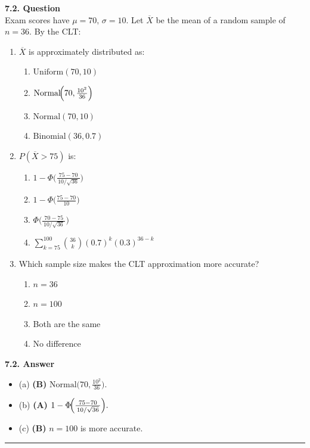 \documentclass[12pt]{article}
\begin{document}
\textbf{7.2. Question}\\
Exam scores have $\mu=70,\,\sigma=10.$ Let $\overline{X}$ be the mean of a random sample of $n=36.$ By the CLT:
\begin{enumerate}[label=(\alph*)]
\item $\overline{X}$ is approximately distributed as:
  \begin{enumerate}[label=\Alph*.]
  \item $\mathrm{Uniform}(70,10)$
  \item $\mathrm{Normal}\!\Bigl(70,\frac{10^2}{36}\Bigr)$
  \item $\mathrm{Normal}(70,10)$
  \item $\mathrm{Binomial}(36,0.7)$
  \end{enumerate}

\item $P(\overline{X}>75)$ is:
  \begin{enumerate}[label=\Alph*.]
  \item $1-\Phi\!\bigl(\tfrac{75-70}{\,10/\sqrt{36}\,}\bigr)$
  \item $1-\Phi\!\bigl(\tfrac{75-70}{10}\bigr)$
  \item $\Phi\!\bigl(\tfrac{70-75}{\,10/\sqrt{36}\,}\bigr)$
  \item $\sum_{k=75}^{100}\binom{36}{k}(0.7)^k(0.3)^{36-k}$
  \end{enumerate}

\item Which sample size makes the CLT approximation more accurate?
  \begin{enumerate}[label=\Alph*.]
  \item $n=36$
  \item $n=100$
  \item Both are the same
  \item No difference
  \end{enumerate}
\end{enumerate}

\noindent
\textbf{7.2. Answer}
\begin{itemize}
\item (a) \textbf{(B)} $\mathrm{Normal}\!\bigl(70,\tfrac{10^2}{36}\bigr).$
\item (b) \textbf{(A)} $1-\Phi\!\Bigl(\tfrac{75-70}{\,10/\sqrt{36}\,}\Bigr).$
\item (c) \textbf{(B)} $n=100$ is more accurate.
\end{itemize}

\hrule
\end{document}
